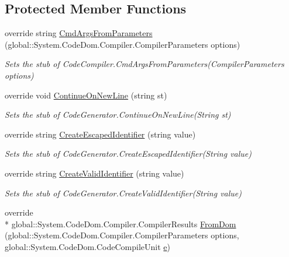 \subsection*{Protected Member Functions}
\begin{DoxyCompactItemize}
\item 
override string \hyperlink{class_system_1_1_code_dom_1_1_compiler_1_1_fakes_1_1_stub_code_compiler_aa9eff55899d7ef7f6db3ef583b631c70}{Cmd\-Args\-From\-Parameters} (global\-::\-System.\-Code\-Dom.\-Compiler.\-Compiler\-Parameters options)
\begin{DoxyCompactList}\small\item\em Sets the stub of Code\-Compiler.\-Cmd\-Args\-From\-Parameters(\-Compiler\-Parameters options)\end{DoxyCompactList}\item 
override void \hyperlink{class_system_1_1_code_dom_1_1_compiler_1_1_fakes_1_1_stub_code_compiler_aa7da35f1f60d248bc7736d72eb5630ee}{Continue\-On\-New\-Line} (string st)
\begin{DoxyCompactList}\small\item\em Sets the stub of Code\-Generator.\-Continue\-On\-New\-Line(\-String st)\end{DoxyCompactList}\item 
override string \hyperlink{class_system_1_1_code_dom_1_1_compiler_1_1_fakes_1_1_stub_code_compiler_ad6b3a501423c639762b2c87e1bf4ef52}{Create\-Escaped\-Identifier} (string value)
\begin{DoxyCompactList}\small\item\em Sets the stub of Code\-Generator.\-Create\-Escaped\-Identifier(\-String value)\end{DoxyCompactList}\item 
override string \hyperlink{class_system_1_1_code_dom_1_1_compiler_1_1_fakes_1_1_stub_code_compiler_ad91bec03a7a57f364c2e1840ebdb6f3f}{Create\-Valid\-Identifier} (string value)
\begin{DoxyCompactList}\small\item\em Sets the stub of Code\-Generator.\-Create\-Valid\-Identifier(\-String value)\end{DoxyCompactList}\item 
override \\*
global\-::\-System.\-Code\-Dom.\-Compiler.\-Compiler\-Results \hyperlink{class_system_1_1_code_dom_1_1_compiler_1_1_fakes_1_1_stub_code_compiler_ae07d89719188bca6c3c7a2243b76b308}{From\-Dom} (global\-::\-System.\-Code\-Dom.\-Compiler.\-Compiler\-Parameters options, global\-::\-System.\-Code\-Dom.\-Code\-Compile\-Unit \hyperlink{jquery-1_810_82_8min_8js_a2c038346d47955cbe2cb91e338edd7e1}{e})

\end{DoxyCompactItemize}
